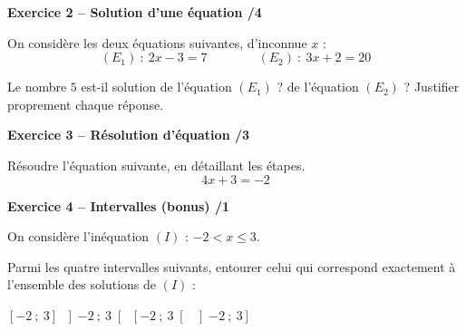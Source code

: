 \documentclass[10pt,a4paper]{article}
\begin{document}
\textbf{Exercice 2 -- Solution d'une équation \hfill /4}

On considère les deux équations suivantes, d'inconnue \(x\) :
\[
(E_1)\ :\ 2x-3=7 \qquad\qquad (E_2)\ :\ 3x+2=20
\]

Le nombre \(5\) est-il solution de l'équation \((E_1)\) ? de l'équation \((E_2)\) ? Justifier proprement chaque réponse.

\vspace{4cm}

\textbf{Exercice 3 -- Résolution d'équation \hfill /3}

Résoudre l'équation suivante, en détaillant les étapes.
\[
4x+3=-2
\]

\vspace{2cm}

\textbf{Exercice 4 -- Intervalles (bonus) \hfill /1}

On considère l'inéquation \((I)\) : \(-2 < x \leqslant 3\).

Parmi les quatre intervalles suivants, entourer celui qui correspond exactement à l'ensemble des solutions de \((I)\) :
\begin{center}
\(\left[-2\ ;\ 3\right]\) \hspace{1.5cm} \(\left]-2\ ;\ 3\right[\) \hspace{1.5cm} \(\left[-2\ ;\ 3\right[\) \hspace{1.5cm} \(\left]-2\ ;\ 3\right]\)
\end{center}
\end{document}
